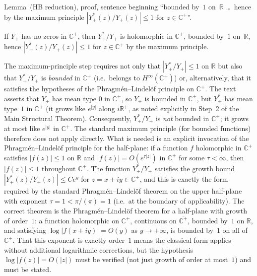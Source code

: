 \documentclass[11pt]{article}
\newcommand{\R}{\mathbb{R}}
\newcommand{\C}{\mathbb{C}}
\begin{document}
\begin{description}[leftmargin=0pt]
\item[Location:]
Lemma~(HB reduction), proof, sentence beginning
``bounded by~$1$ on~$\R$ \ldots\ hence by the maximum principle
$|Y_+^*(z)/Y_+(z)|\le 1$ for $z\in\C^+$''.

\item[Claim as written:]
If $Y_+$ has no zeros in $\C^+$, then $Y_+^*/Y_+$ is holomorphic in $\C^+$,
bounded by~$1$ on~$\R$, hence $|Y_+^*(z)/Y_+(z)|\le 1$ for $z\in\C^+$
by the maximum principle.

\item[What is relied on but not established in the text:]
The maximum-principle step requires not only that $|Y_+^*/Y_+|\le 1$ on
$\R$ but also that $Y_+^*/Y_+$ is \emph{bounded} in $\C^+$
(i.e.\ belongs to $H^\infty(\C^+)$) or, alternatively, that it satisfies the
hypotheses of the Phragm\'{e}n--Lindel\"{o}f principle on $\C^+$.
The text asserts that $Y_+$ has mean type $0$ in $\C^+$, so $Y_+$ is bounded in
$\C^+$, but $Y_+^*$ has mean type~$1$ in $\C^+$ (it grows like $e^{|y|}$ along
$i\R^+$, as noted explicitly in Step~2 of the Main Structural Theorem).
Consequently, $Y_+^*/Y_+$ is \emph{not} bounded in $\C^+$; it grows at most like
$e^{|y|}$ in $\C^+$.
The standard maximum principle (for bounded functions) therefore does not apply
directly.
What is needed is an explicit invocation of the Phragm\'{e}n--Lindel\"{o}f
principle for the half-plane: if a function $f$ holomorphic in $\C^+$ satisfies
$|f(z)|\le 1$ on $\R$ and $|f(z)|=O(e^{\tau|z|})$ in $\C^+$ for some
$\tau<\infty$, then $|f(z)|\le 1$ throughout $\C^+$.
The function $Y_+^*/Y_+$ satisfies the growth bound $|Y_+^*(z)/Y_+(z)|\le C e^{y}$
for $z=x+iy\in\C^+$, and this is exactly the form required by the standard
Phragm\'{e}n--Lindel\"{o}f theorem on the upper half-plane with exponent
$\tau=1<\pi/(\pi)=1$ (i.e.\ at the boundary of applicability).
The correct theorem is the Phragm\'{e}n--Lindel\"{o}f theorem for a half-plane with
growth of order~$1$: a function holomorphic on $\C^+$, continuous on
$\overline{\C^+}$, bounded by~$1$ on $\R$, and satisfying
$\log|f(x+iy)|=O(y)$ as $y\to+\infty$, is bounded by~$1$ on all of $\C^+$.
That this exponent is exactly order~$1$ means the classical form applies without
additional logarithmic corrections, but the hypothesis $\log|f(z)|=O(|z|)$ must
be verified (not just growth of order at most~$1$) and must be stated.


\end{description}
\end{document}
